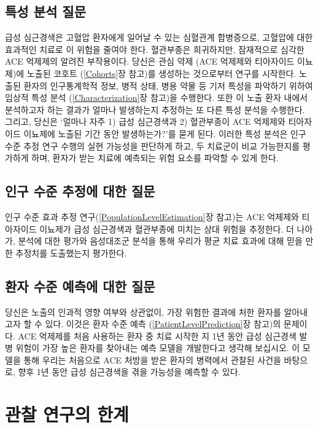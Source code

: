 \documentclass[10.5pt]{book}
\theoremstyle{definition}
\theoremstyle{definition}
\theoremstyle{definition}
\theoremstyle{remark}
\begin{document}
\subsection{특성 분석 질문}\label{--}

급성 심근경색은 고혈압 환자에게 일어날 수 있는 심혈관계 합병증으로,
고혈압에 대한 효과적인 치료로 이 위험을 줄여야 한다. 혈관부종은
희귀하지만, 잠재적으로 심각한 ACE 억제제의 알려진 부작용이다. 당신은
관심 약제 (ACE 억제제와 티아자이드 이뇨제)에 노출된 코호트
(\ref{Cohorts}장 참고)를 생성하는 것으로부터 연구를 시작한다. 노출된
환자의 인구통계학적 정보, 병적 상태, 병용 약물 등 기저 특성을 파악하기
위하여 임상적 특성 분석 (\ref{Characterization}장 참고)을 수행한다. 또한
이 노출 환자 내에서 분석하고자 하는 결과가 얼마나 발생하는지 추정하는 또
다른 특성 분석을 수행한다. 그리고, 당신은 `얼마나 자주 1) 급성
심근경색과 2) 혈관부종이 ACE 억제제와 티아자이드 이뇨제에 노출된 기간
동안 발생하는가?'를 묻게 된다. 이러한 특성 분석은 인구 수준 추정 연구
수행의 실현 가능성을 판단하게 하고, 두 치료군이 비교 가능한지를 평가하게
하며, 환자가 받는 치료에 예측되는 위험 요소를 파악할 수 있게 한다.

\subsection{인구 수준 추정에 대한 질문}\label{----}

인구 수준 효과 추정 연구(\ref{PopulationLevelEstimation}장 참고)는 ACE
억제제와 티아자이드 이뇨제가 급성 심근경색과 혈관부종에 미치는 상대
위험을 추정한다. 더 나아가, 분석에 대한 평가와 음성대조군 분석을 통해
우리가 평균 치료 효과에 대해 믿을 만한 추정치를 도출했는지 평가한다.

\subsection{환자 수준 예측에 대한 질문}\label{----}

당신은 노출의 인과적 영향 여부와 상관없이, 가장 위험한 결과에 처한
환자를 알아내고자 할 수 있다. 이것은 환자 수준 예측
(\ref{PatientLevelPrediction}장 참고)의 문제이다. ACE 억제제를 처음
사용하는 환자 중 치료 시작한 지 1년 동안 급성 심근경색 발병 위험이 가장
높은 환자를 찾아내는 예측 모델을 개발한다고 생각해 보십시오. 이 모델을
통해 우리는 처음으로 ACE 처방을 받은 환자의 병력에서 관찰된 사건을
바탕으로, 향후 1년 동안 급성 심근경색을 겪을 가능성을 예측할 수 있다.

\section{관찰 연구의 한계}\label{--}
\end{document}

